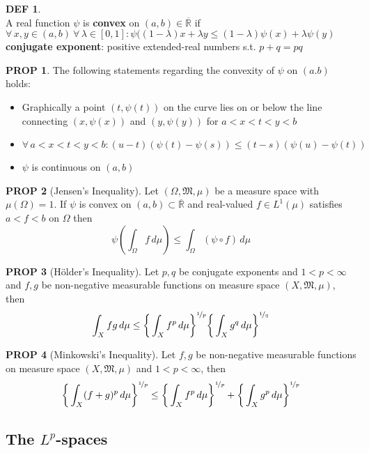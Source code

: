 \documentclass[hidelinks,10pt]{article}
\theoremstyle{definition}
\newtheorem*{defin}{DEF}
\theoremstyle{dotles}
\theoremstyle{dotless}
\newtheorem{proposition}{PROP}[section]
\theoremstyle{remark}
\begin{document}
\begin{defin}~\\
A real function $\psi$ is \textbf{convex} on $(a,b)\in\overline{\mathbb{R}}$ if $\forall\,x,y\in(a,b)\ \forall\,\lambda\in[0,1]:\psi((1-\lambda)x+\lambda y\leq(1-\lambda)\psi(x)+\lambda\psi(y)$\bigbreak
\textbf{conjugate exponent}: positive extended-real numbers s.t. $p+q=pq$
\end{defin}

\begin{proposition}
The following statements regarding the convexity of $\psi$ on $(a.b)$ holds:\begin{itemize}
    \item Graphically a point $(t,\psi(t))$ on the curve lies on or below the line connecting $(x,\psi(x))$ and $(y,\psi(y))$ for $a<x<t<y<b$
    \item $\forall\,a<x<t<y<b:(u-t)(\psi(t)-\psi(s))\leq(t-s)(\psi(u)-\psi(t))$
    \item $\psi$ is continuous on $(a,b)$
\end{itemize}
\end{proposition}

\begin{proposition}[Jensen's Inequality]
Let $(\Omega,\mathfrak{M},\mu)$ be a measure space with $\mu(\Omega)=1$. If $\psi$ is convex on $(a,b)\subset\overline{\mathbb{R}}$ and real-valued $f\in L^1(\mu)$ satisfies $a<f<b$ on $\Omega$ then
\[\psi\left(\int_\Omega f\,d\mu\right)\leq\int_\Omega(\psi\circ f)\,d\mu\]
\end{proposition}

\begin{proposition}[Hölder's Inequality]
Let $p,q$ be conjugate exponents and $1<p<\infty$ and $f,g$ be non-negative measurable functions on measure space $(X,\mathfrak{M},\mu)$, then
\[\int_Xfg\,d\mu\leq\bigg\{\int_Xf^p\,d\mu\bigg\}^{\nicefrac{1}{p}}\bigg\{\int_Xg^q\,d\mu\bigg\}^{\nicefrac{1}{q}}\]
\end{proposition}

\begin{proposition}[Minkowski's Inequality]
Let $f,g$ be non-negative measurable functions on measure space $(X,\mathfrak{M},\mu)$ and $1<p<\infty$, then
\[\bigg\{\int_X(f+g)^p\,d\mu\bigg\}^{\nicefrac{1}{p}}\leq\bigg\{\int_Xf^p\,d\mu\bigg\}^{\nicefrac{1}{p}}+\bigg\{\int_Xg^p\,d\mu\bigg\}^{\nicefrac{1}{p}}\]
\end{proposition}

\subsection{The $L^p$-spaces}
\end{document}
